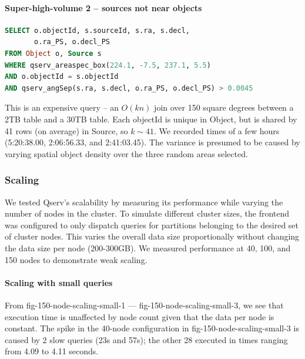 \documentclass[DM,lsstdraft,toc]{lsstdoc}
\begin{document}
\paragraph{Super-high-volume 2 -- sources not near
objects}\label{super-high-volume-2-sources-not-near-objects}

\begin{lstlisting}[language=SQL]
SELECT o.objectId, s.sourceId, s.ra, s.decl,
       o.ra_PS, o.decl_PS
FROM Object o, Source s
WHERE qserv_areaspec_box(224.1, -7.5, 237.1, 5.5)
AND o.objectId = s.objectId
AND qserv_angSep(s.ra, s.decl, o.ra_PS, o.decl_PS) > 0.0045
\end{lstlisting}

This is an expensive query -- an \(O(kn)\) join over 150 square degrees
between a 2TB table and a 30TB table. Each objectId is unique in Object,
but is shared by 41 rows (on average) in Source, so \(k
\sim 41\). We recorded times of a few hours (5:20:38.00, 2:06:56.33, and
2:41:03.45). The variance is presumed to be caused by varying spatial
object density over the three random areas selected.

\subsubsection{Scaling}\label{scaling}

We tested Qserv's scalability by measuring its performance while varying
the number of nodes in the cluster. To simulate different cluster sizes,
the frontend was configured to only dispatch queries for partitions
belonging to the desired set of cluster nodes. This varies the overall
data size proportionally without changing the data size per node
(200-300GB). We measured performance at 40, 100, and 150 nodes to
demonstrate weak scaling.

\paragraph{Scaling with small queries}\label{scaling-with-small-queries}

From fig-150-node-scaling-small-1 --- fig-150-node-scaling-small-3, we
see that execution time is unaffected by node count given that the data
per node is constant. The spike in the 40-node configuration in
fig-150-node-scaling-small-3 is caused by 2 slow queries (23s and 57s);
the other 28 executed in times ranging from 4.09 to 4.11 seconds.
\end{document}
